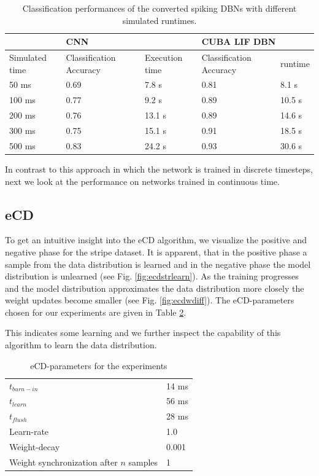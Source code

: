 \begin{table}[]
\centering
\caption{Classification performances of the converted spiking DBNs with different simulated runtimes.}
\label{tab:pervovert}
\begin{tabular}{|l|l|l|l|l|}
\hline
	 				& \multicolumn{2}{|l|}{CNN}   & \multicolumn{2}{|l|}{CUBA LIF DBN} \\ \hline
Simulated time		 				& Classification Accuracy    & Execution time & Classification Accuracy    & runtime \\ \hline
50 ms    	& 0.69 & 7.8 s 		& 0.81 & 8.1 s               \\
100 ms     	& 0.77 & 9.2 s  	& 0.89 & 10.5 s              \\
200 ms    	& 0.76 & 13.1 s   & 0.89 & 14.6 s             \\
300 ms    	& 0.75 & 15.1 s   & 0.91 & 18.5 s             \\
500 ms     	& 0.83 & 24.2 s    & 0.93 & 30.6 s             \\\hline
\end{tabular}
\end{table}

In contrast to this approach in which the network is trained in discrete timesteps, next we look at the performance on networks trained in continuous time.  

\subsection{eCD} \label{c:ecdexp}

To get an intuitive insight into the eCD algorithm, we visualize the positive and negative phase for the stripe dataset.
It is apparent, that in the positive phase a sample from the data distribution is learned and in the negative phase the model distribution is unlearned (see Fig. \ref{fig:ecdstrlearn}).
As the training progresses and the model distribution approximates the data distribution more closely the weight updates become smaller (see Fig. \ref{fig:ecdwdiff}). 
The eCD-parameters chosen for our experiments are given in Table \ref{tab:ecdrunparam}.

This indicates some learning and we further inspect the capability of this algorithm to learn the data distribution.

\begin{table}[]
\caption{eCD-parameters for the experiments}
\centering
\label{tab:ecdrunparam}
\begin{tabular}{|ll|}
\hline
$t_{burn-in}$    	& 14 ms 		    \\
$t_{learn}$    		& 56 ms 		     \\
$t_{flush}$    		& 28 ms		             \\
Learn-rate     		& 1.0 		                 \\
Weight-decay    	& 0.001		              \\
Weight synchronization after $n$ samples     	& 1		              \\\hline
\end{tabular}
\end{table}



